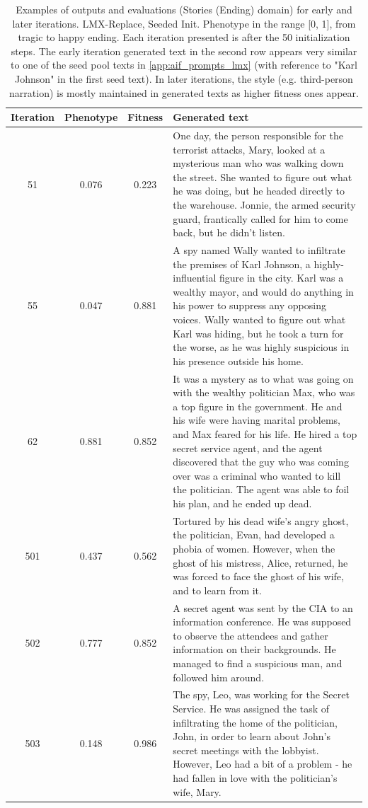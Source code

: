 \begin{table}[ht]
  \caption{Examples of outputs and evaluations (Stories (Ending) domain) for early and later iterations. LMX-Replace, Seeded Init. Phenotype in the range [0, 1], from tragic to happy ending. Each iteration presented is after the 50 initialization steps. The early iteration generated text in the second row appears very similar to one of the seed pool texts in \ref{app:aif_prompts_lmx} (with reference to "Karl Johnson" in the first seed text). In later iterations, the style (e.g. third-person narration) is mostly maintained in generated texts as higher fitness ones appear.}
  \begin{center}
  \small
  \begin{tabular}{cccp{8.5cm}}
    \toprule
    Iteration     & Phenotype  & Fitness     & Generated text \\
    \midrule
    51 &  0.076 & 0.223 &  One day, the person responsible for the terrorist attacks, Mary, looked at a mysterious man who was walking down the street. She wanted to figure out what he was doing, but he headed directly to the warehouse. Jonnie, the armed security guard, frantically called for him to come back, but he didn't listen. \\
    \midrule
    55 & 0.047 & 0.881 &  A spy named Wally wanted to infiltrate the premises of Karl Johnson, a highly-influential figure in the city. Karl was a wealthy mayor, and would do anything in his power to suppress any opposing voices. Wally wanted to figure out what Karl was hiding, but he took a turn for the worse, as he was highly suspicious in his presence outside his home. \\
    \midrule
    62 & 0.881 & 0.852 &  It was a mystery as to what was going on with the wealthy politician Max, who was a top figure in the government. He and his wife were having marital problems, and Max feared for his life. He hired a top secret service agent, and the agent discovered that the guy who was coming over was a criminal who wanted to kill the politician. The agent was able to foil his plan, and he ended up dead. \\
    \midrule
    \midrule
    501 & 0.437 & 0.562 & Tortured by his dead wife's angry ghost, the politician, Evan, had developed a phobia of women. However, when the ghost of his mistress, Alice, returned, he was forced to face the ghost of his wife, and to learn from it. \\
    \midrule
    502 & 0.777 & 0.852 & A secret agent was sent by the CIA to an information conference. He was supposed to observe the attendees and gather information on their backgrounds. He managed to find a suspicious man, and followed him around. \\
    \midrule
    503 & 0.148 & 0.986 & The spy, Leo, was working for the Secret Service. He was assigned the task of infiltrating the home of the politician, John, in order to learn about John's secret meetings with the lobbyist. However, Leo had a bit of a problem - he had fallen in love with the politician's wife, Mary. \\
    \bottomrule
  \end{tabular}
  \end{center}
  \label{app:table_iter_stories_ending_replace_seed}
\end{table}